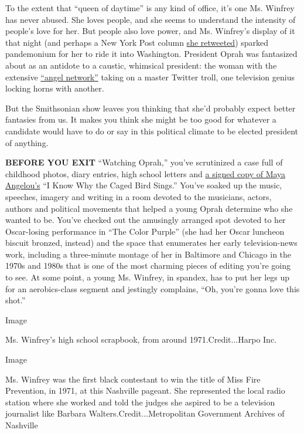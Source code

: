 To the extent that ``queen of daytime'' is any kind of office, it's one
Ms. Winfrey has never abused. She loves people, and she seems to
understand the intensity of people's love for her. But people also love
power, and Ms. Winfrey's display of it that night (and perhaps a New
York Post column
\href{http://ew.com/tv/2017/09/29/oprah-for-president-2020/}{she
retweeted}) sparked pandemonium for her to ride it into Washington.
President Oprah was fantasized about as an antidote to a caustic,
whimsical president: the woman with the extensive
\href{http://www.oprah.com/pressroom/about-oprahs-angel-network}{``angel
network''} taking on a master Twitter troll, one television genius
locking horns with another.

But the Smithsonian show leaves you thinking that she'd probably expect
better fantasies from us. It makes you think she might be too good for
whatever a candidate would have to do or say in this political climate
to be elected president of anything.

\textbf{BEFORE YOU EXIT} ``Watching Oprah,'' you've scrutinized a case
full of childhood photos, diary entries, high school letters and
\href{https://www.youtube.com/watch?v=fx447ShQLeE}{a signed copy of Maya
Angelou's} ``I Know Why the Caged Bird Sings.'' You've soaked up the
music, speeches, imagery and writing in a room devoted to the musicians,
actors, authors and political movements that helped a young Oprah
determine who she wanted to be. You've checked out the amusingly
arranged spot devoted to her Oscar-losing performance in ``The Color
Purple'' (she had her Oscar luncheon biscuit bronzed, instead) and the
space that enumerates her early television-news work, including a
three-minute montage of her in Baltimore and Chicago in the 1970s and
1980s that is one of the most charming pieces of editing you're going to
see. At some point, a young Ms. Winfrey, in spandex, has to put her legs
up for an aerobics-class segment and jestingly complains, ``Oh, you're
gonna love this shot.''

Image

Ms. Winfrey's high school scrapbook, from around 1971.Credit...Harpo
Inc.

Image

Ms. Winfrey was the first black contestant to win the title of Miss Fire
Prevention, in 1971, at this Nashville pageant. She represented the
local radio station where she worked and told the judges she aspired to
be a television journalist like Barbara Walters.Credit...Metropolitan
Government Archives of Nashville

